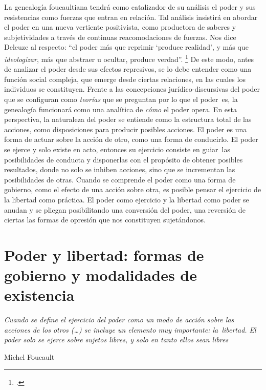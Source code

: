 La genealogía foucaultiana tendrá como catalizador de su análisis el poder y sus resistencias como fuerzas que entran en relación. Tal análisis insistirá en abordar el poder en una nueva vertiente positivista, como productora de saberes y subjetividades a través de continuas reacomodaciones de fuerzas. Nos dice Deleuze al respecto: \enquote{el poder más que reprimir \enquote{produce realidad}, y más que \emph{ideologizar}, más que abstraer u ocultar, produce verdad}. \footcite[][104]{@7047-FOUCAULT2008} De este modo, antes de analizar el poder desde sus efectos represivos, se lo debe entender como una función social compleja, que emerge desde ciertas relaciones, en las cuales los individuos se constituyen. Frente a las concepciones jurídico-discursivas del poder que se configuran como \emph{teorías} que se preguntan por lo que el poder~es, la genealogía funcionará como una analítica de \emph{cómo} el poder opera. En esta perspectiva, la naturaleza del poder se entiende como la estructura total de las acciones, como disposiciones para producir posibles acciones. El poder es una forma de actuar sobre la acción de otro, como una forma de conducirlo. El poder se ejerce y solo existe en acto, entonces su ejercicio consiste en guiar~las posibilidades de conducta y disponerlas con el propósito de obtener posibles resultados, donde no solo se inhiben acciones, sino que se incrementan las posibilidades de otras. Cuando se comprende el poder como una forma de gobierno, como el efecto de una acción sobre otra, es posible pensar el ejercicio de la libertad como práctica. El poder como ejercicio y la libertad como poder se anudan y se pliegan posibilitando una conversión del poder, una reversión de ciertas las formas de opresión que nos constituyen sujetándonos.

\section{Poder y libertad: formas de gobierno y modalidades de existencia}

\epigraph{\emph{Cuando se define el ejercicio del poder como un modo de acción sobre las acciones de los otros (\ldots) se incluye un elemento muy importante: la~libertad. El poder solo se ejerce sobre sujetos libres, y solo en tanto ellos sean libres}}{Michel Foucault}

